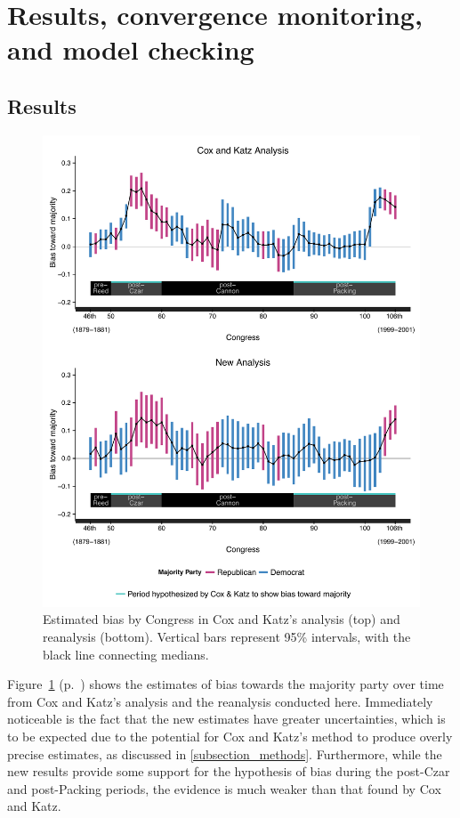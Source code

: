 \section{Results, convergence monitoring, and model checking}


\subsection{Results}
\label{results}

\begin{figure}
\centering
\includegraphics[scale=0.75]{sections/figs/ck_replication}
\caption{Estimated bias by Congress in Cox and Katz's analysis (top) and reanalysis (bottom). Vertical bars represent 95\%  intervals, with the black line connecting medians.}
\label{fig:ck_bias}
\end{figure}

Figure~\ref{fig:ck_bias} (p.~\pageref{fig:ck_bias}) shows the estimates of bias towards the majority party over time from Cox and Katz's analysis and the reanalysis conducted here. Immediately noticeable is the fact that the new estimates have greater uncertainties, which is to be expected due to the potential for Cox and Katz's method to produce overly precise estimates, as discussed in \ref{subsection_methods}. Furthermore, while the new results provide some support for the hypothesis of bias during the post-Czar and post-Packing periods, the evidence is much weaker than that found by Cox and Katz. 

